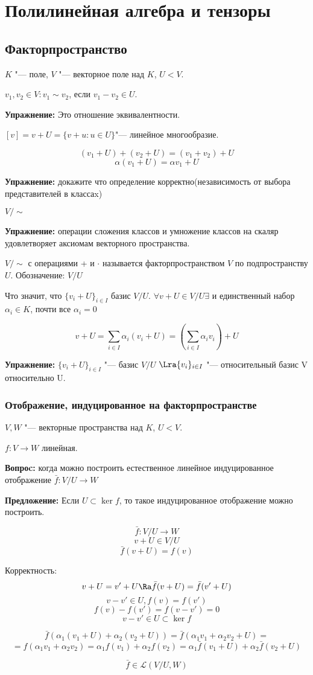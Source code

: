 ﻿\chapter{Полилинейная алгебра и тензоры}
\section{Факторпространство}
$K$ "--- поле, $V$ "--- векторное поле над $K$, $U < V$.

$v_1, v_2 \in V \colon v_1 \sim v_2$, если $v_1 - v_2 \in U$. 

\textbf{Упражнение:} Это отношение эквивалентности. 

$[v] = v + U = \{v + u\colon u \in U\}$"--- линейное многообразие. 

$$(v_1 + U) + (v_2 + U) = (v_1 + v_2) + U$$
$$\alpha(v_1 + U) = \alpha v_1 + U$$

\textbf{Упражнение:} докажите что определение корректно(независимость от выбора представителей в классаx)

$V/\sim$

\textbf{Упражнение:} операции сложения классов и умножение классов на скаляр удовлетворяет аксиомам векторного пространства.

$V/\sim$ с операциями + и $\cdot$ называется факторпространством $V$ по подпространству $U$. Обозначение: $V/U$ 

Что значит, что $\{v_i + U\}_{i \in I}$ базис $V/U$.
$\forall v + U \in V/U
\exists$ и единственный набор $\alpha_i \in K$, почти все $\alpha_i = 0$

$$v + U = \sum_{i \in I}\alpha_i(v_i + U) = (\sum_{i \in I}\alpha_i v_i) + U $$


\textbf{Упражнение:}
$\{v_i + U\}_{i \in I}$  "--- базис $V/U$
$\Lra \{v_i\}_{i \in I}$ "--- относительный базис V относительно U.

\subsection{Отображение, индуцированное на факторпространстве}
    $V, W$ "--- векторные пространства над $K$, $U < V$.

    $ f \colon V \to W$ линейная. 
    
    \textbf{Вопроc:} когда можно построить естественное линейное индуцированное отображение $\bar f \colon  V / U \to W$

    \textbf{Предложение:} Если $U \subset \ker f$, то такое индуцированное отображение можно построить. 

    $$\bar f \colon V/U \to W$$
    $$v + U \in V/U$$
    $$\bar f(v + U) = f(v)$$

    Корректность: 
    $$v + U = v' + U \Ra \bar f(v + U) = \bar f (v' + U)$$
    $$v - v' \in U, f(v) = f(v')$$
    $$f(v) - f(v') = f(v - v' ) = 0$$
    $$v - v' \in U \subset \ker f $$

    $$\bar f(\alpha_1(v_1 + U) + \alpha_2(v_2 + U)) = \bar f(\alpha_1 v_1 + \alpha_2 v_2 + U) = $$
    $$= f(\alpha_1 v_1 + \alpha_2 v_2) = \alpha_1 f(v_1) + \alpha_2 f(v_2) = \alpha_1 \bar f(v_1 + U) + \alpha_2\bar f(v_2 + U) $$

    $$\bar f \in \mathcal{L}(V/U, W)$$


